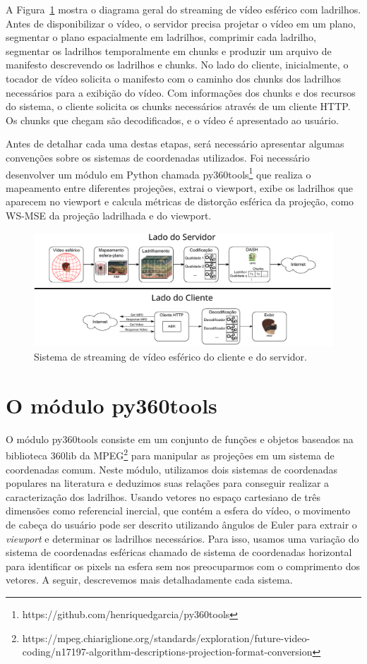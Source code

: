 A Figura~\ref{fig:streaming_client_server} mostra o diagrama geral do streaming de vídeo esférico com ladrilhos. Antes de disponibilizar o vídeo, o servidor precisa projetar o vídeo em um plano, segmentar o plano espacialmente em ladrilhos, comprimir cada ladrilho, segmentar os ladrilhos temporalmente em chunks e produzir um arquivo de manifesto descrevendo os ladrilhos e chunks. No lado do cliente, inicialmente, o tocador de vídeo solicita o manifesto com o caminho dos chunks dos ladrilhos necessários para a exibição do vídeo. Com informações dos chunks e dos recursos do sistema, o cliente solicita os chunks necessários através de um cliente HTTP. Os chunks que chegam são decodificados, e o vídeo é apresentado ao usuário.


Antes de detalhar cada uma destas etapas, será necessário apresentar algumas convenções sobre os sistemas de coordenadas utilizados. Foi necessário desenvolver um módulo em Python chamada py360tools\footnote{https://github.com/henriquedgarcia/py360tools} que realiza o mapeamento entre diferentes projeções, extrai o viewport, exibe os ladrilhos que aparecem no viewport e calcula métricas de distorção esférica da projeção, como WS-MSE da projeção ladrilhada e do viewport.


\begin{figure}[h]
	\centering
	\includegraphics[width=0.9\linewidth]{"fig/Streaming - client-side and server-side.pdf"}
	\caption{Sistema de streaming de vídeo esférico do cliente e do servidor.}
	\label{fig:streaming_client_server}
\end{figure}

\section{O módulo py360tools}

O módulo py360tools consiste em um conjunto de funções e objetos baseados na biblioteca 360lib da MPEG\footnote{https://mpeg.chiariglione.org/standards/exploration/future-video-coding/n17197-algorithm-descriptions-projection-format-conversion} para manipular as projeções em um sistema de coordenadas comum. Neste módulo, utilizamos dois sistemas de coordenadas populares na literatura e deduzimos suas relações para conseguir realizar a caracterização dos ladrilhos. Usando vetores no espaço cartesiano de três dimensões como referencial inercial, que contém a esfera do vídeo, o movimento de cabeça do usuário pode ser descrito utilizando ângulos de Euler para extrair o \textit{viewport} e determinar os ladrilhos necessários. Para isso, usamos uma variação do sistema de coordenadas esféricas chamado de sistema de coordenadas horizontal para identificar os pixels na esfera sem nos preocuparmos com o comprimento dos vetores. A seguir, descrevemos mais detalhadamente cada sistema.

